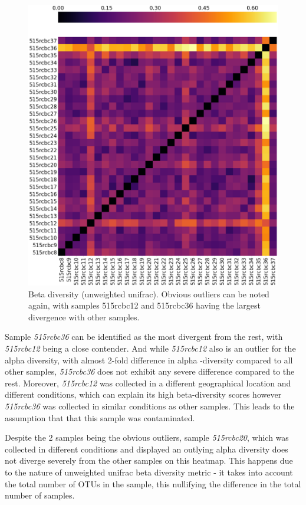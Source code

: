 \documentclass[12pt,twocolumn]{article}
\begin{document}
\begin{figure}[ht!]
	\includegraphics[width=\linewidth]{unweighted_beta.png}
	\caption{Beta diversity (unweighted unifrac). Obvious outliers can be noted again, with samples 515rcbc12 and 515rcbc36 having the largest divergence with other samples.}
	\label{fig:beta_diversity}
\end{figure}
\par
 Sample \textit{515rcbc36} can be identified as the most divergent from the rest, with \textit{515rcbc12} being a close contender. And while \textit{515rcbc12} also is an outlier for the alpha diversity, with almost 2-fold difference in alpha -diversity compared to all other samples, \textit{515rcbc36} does not exhibit any severe difference compared to the rest. Moreover, \textit{515rcbc12} was collected in a different geographical location and different conditions, which can explain its high beta-diversity scores however \textit{515rcbc36} was collected in similar conditions as other samples. This leads to the assumption that that this sample was contaminated.
\par
Despite the 2 samples being the obvious outliers, sample \textit{515rcbc20}, which was collected in different conditions and displayed an outlying alpha diversity does not diverge severely from the other samples on this heatmap. This happens due to the nature of unweighted unifrac beta diversity metric - it takes into account the total number of OTUs in the sample, this nullifying the difference in the total number of samples.
\end{document}
